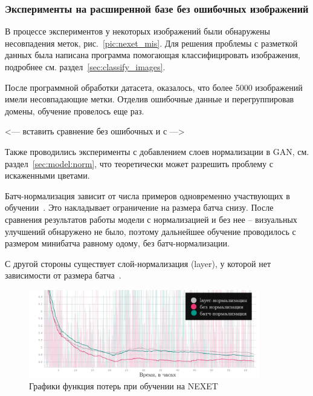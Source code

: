 \documentclass[11pt,a4paper]{extarticle}
\begin{document}
{			\subsubsection{Эксперименты на расширенной базе без ошибочных изображений}\label{sec:tests:nexet_no_err}
				
				В процессе экспериментов у некоторых изображений были обнаружены несовпадения меток, рис.~\ref{pic:nexet_mis}. 
				Для решения проблемы с разметкой данных была написана программа помогающая классифицировать изображения, подробнее см. раздел~\ref{sec:classify_images}.

				После программной обработки датасета, оказалось, что более 5000 изображений имели несовпадающие метки.
				Отделив ошибочные данные и перегруппировав домены, обучение провелось еще раз.
				\begin{center}
					<--- вставить сравнение без ошибочных и с --->
				\end{center}
				Также проводились эксперименты с добавлением слоев нормализации в GAN, см. раздел~\ref{sec:model:norm}, что теоретически может разрешить проблему с искаженными цветами.

				Батч-нормализация зависит от числа примеров одновременно участвующих в обучении~\cite{n_batch}. Это накладывает ограничение на размера батча снизу.
				После сравнения результатов работы модели с нормализацией и без нее -- визуальных улучшений обнаружено не было, поэтому дальнейшее обучение проводилось с размером минибатча равному одому, без батч-нормализации.

				С другой стороны существует слой-нормализация (layer), у которой нет зависимости от размера батча~\cite{n_layer}.

				\begin{figure}[ht]
					\centering
					\includegraphics[width=0.9\textwidth]{img/loss_gen}
					\caption{Графики функция потерь при обучении на NEXET}
					\label{pic:loss_gen}
				\end{figure}
				
				
				
}
\end{document}
